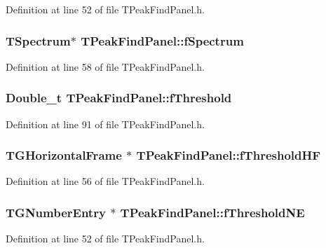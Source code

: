 Definition at line 52 of file TPeakFindPanel.h.
\subsubsection[{fSpectrum}]{\setlength{\rightskip}{0pt plus 5cm}TSpectrum$\ast$ {\bf TPeakFindPanel::fSpectrum}\hspace{0.3cm}{\ttfamily  [private]}}\label{classTPeakFindPanel_a9edb774f14fa459a97e99a134b765d4e}


Definition at line 58 of file TPeakFindPanel.h.
\subsubsection[{fThreshold}]{\setlength{\rightskip}{0pt plus 5cm}Double\_\-t {\bf TPeakFindPanel::fThreshold}\hspace{0.3cm}{\ttfamily  [protected]}}\label{classTPeakFindPanel_a4fb254ac20318cdfdb04ade53ea60c6f}


Definition at line 91 of file TPeakFindPanel.h.
\subsubsection[{fThresholdHF}]{\setlength{\rightskip}{0pt plus 5cm}TGHorizontalFrame $\ast$ {\bf TPeakFindPanel::fThresholdHF}\hspace{0.3cm}{\ttfamily  [private]}}\label{classTPeakFindPanel_a78fef149c7014c9bb22332e6f6acdee1}


Definition at line 56 of file TPeakFindPanel.h.
\subsubsection[{fThresholdNE}]{\setlength{\rightskip}{0pt plus 5cm}TGNumberEntry $\ast$ {\bf TPeakFindPanel::fThresholdNE}\hspace{0.3cm}{\ttfamily  [private]}}\label{classTPeakFindPanel_a3e6b761a943f9531a12d7306d81e9a4f}


Definition at line 52 of file TPeakFindPanel.h.
